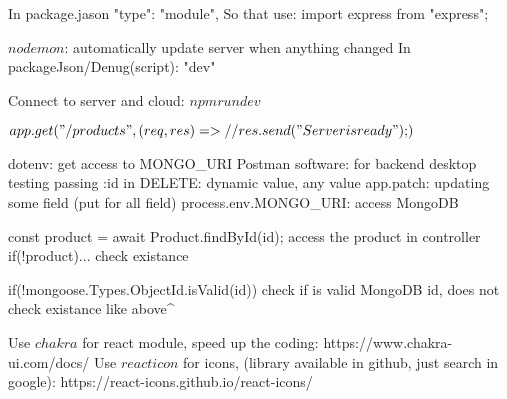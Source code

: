 In package.jason
    "type": "module",
    So that use: import express from "express";

    $nodemon$: automatically update server when anything changed
        In packageJson/Denug(script): "dev"

Connect to server and cloud: $  npm run dev  $

${
app.get("/products",(req,res) => {     %
    // res.send("Server is ready");
})
}$

dotenv:                                         get access to MONGO_URI
Postman software:                               for backend desktop testing
passing :id in DELETE:                          dynamic value, any value  
app.patch:                                      updating some field (put for all field)
process.env.MONGO_URI:                          access MongoDB

const product = await Product.findById(id);     access the product in controller
if(!product)...                                 check existance

if(!mongoose.Types.ObjectId.isValid(id))        check if is valid MongoDB id, does not check existance like above^


Use $chakra$ for react module, speed up the coding: https://www.chakra-ui.com/docs/
Use $react icon$ for icons, (library available in github, just search in google): https://react-icons.github.io/react-icons/
